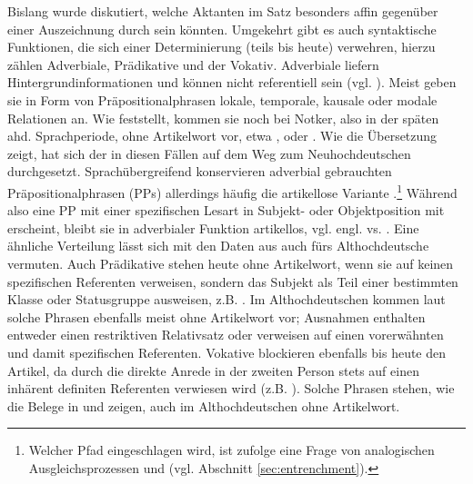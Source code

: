 Bislang wurde diskutiert, welche Aktanten im Satz besonders affin gegenüber einer Auszeichnung durch  sein könnten. Umgekehrt gibt es auch syntaktische Funktionen, die sich einer Determinierung (teils bis heute) verwehren, hierzu zählen  Adverbiale, Prädikative  und der  Vokativ. Adverbiale  liefern Hintergrundinformationen und können nicht referentiell sein (vgl. ). Meist geben sie in Form von Präpositionalphrasen lokale, temporale, kausale oder modale Relationen an. Wie \textcite[84]{Oubouzar1992} feststellt, kommen sie noch bei Notker, also in der späten ahd. Sprachperiode, ohne Artikelwort vor, etwa  ,   oder   \parencite[vgl. auch][76]{Szczepaniak2011a}. Wie die Übersetzung zeigt, hat sich der  in diesen Fällen auf dem Weg zum Neuhochdeutschen durchgesetzt. Sprachübergreifend konservieren adverbial  gebrauchten Präpositionalphrasen  (PPs) allerdings häufig die artikellose Variante \parencite{Himmelmann1998}.\footnote{Welcher Pfad eingeschlagen wird, ist \textcite[342 und 344--345]{Himmelmann1998} zufolge eine Frage von analogischen  Ausgleichsprozessen und  (vgl. Abschnitt \ref{sec:entrenchment}).} Während also eine PP  mit einer spezifischen Lesart in Subjekt-  oder Objektposition  mit  erscheint, bleibt sie in adverbialer  Funktion artikellos, vgl. engl.  vs.  \parencite[332]{Himmelmann1998}. Eine ähnliche Verteilung lässt sich mit den Daten aus \textcite[84--85]{Oubouzar1992} auch fürs Althochdeutsche vermuten. Auch Prädikative  stehen heute ohne Artikelwort, wenn sie auf keinen spezifischen Referenten verweisen, sondern das Subjekt als Teil einer bestimmten Klasse oder Statusgruppe ausweisen, z.B.  \parencite[vgl.][218]{DAvis2013}. Im Althochdeutschen kommen laut \textcite[6--8]{Graf1905} solche Phrasen  ebenfalls meist ohne Artikelwort vor; Ausnahmen enthalten entweder einen restriktiven Relativsatz oder verweisen auf einen  vorerwähnten und damit spezifischen Referenten. Vokative  blockieren ebenfalls bis heute den Artikel, da durch die direkte Anrede in der zweiten Person stets auf einen inhärent definiten  Referenten verwiesen wird (z.B. ). Solche Phrasen   stehen, wie die Belege in \textcite[13]{Graf1905} und \textcite[40]{Bell1907} zeigen, auch im Althochdeutschen ohne Artikelwort. 


